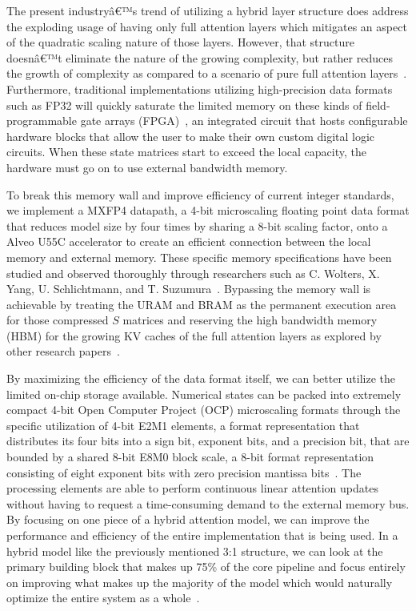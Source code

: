 ﻿\documentclass[conference]{IEEEtran}
\begin{document}
The present industryâ€™s trend of utilizing a hybrid layer structure does address the exploding usage of having only full attention layers which mitigates an aspect of the quadratic scaling nature of those layers. However, that structure doesnâ€™t eliminate the nature of the growing complexity, but rather reduces the growth of complexity as compared to a scenario of pure full attention layers~\cite{b9}. Furthermore, traditional implementations utilizing high-precision data formats such as FP32 will quickly saturate the limited memory on these kinds of field-programmable gate arrays (FPGA)~\cite{b10}, an integrated circuit that hosts configurable hardware blocks that allow the user to make their own custom digital logic circuits. When these state matrices start to exceed the local capacity, the hardware must go on to use external bandwidth memory.

To break this memory wall and improve efficiency of current integer standards, we implement a MXFP4 datapath, a 4-bit microscaling floating point data format that reduces model size by four times by sharing a 8-bit scaling factor, onto a Alveo U55C accelerator to create an efficient connection between the local memory and external memory. These specific memory specifications have been studied and observed thoroughly through researchers such as C. Wolters, X. Yang, U. Schlichtmann, and T. Suzumura~\cite{b5}. Bypassing the memory wall is achievable by treating the URAM and BRAM as the permanent execution area for those compressed $S$ matrices and reserving the high bandwidth memory (HBM) for the growing KV caches of the full attention layers as explored by other research papers~\cite{b10}.

By maximizing the efficiency of the data format itself, we can better utilize the limited on-chip storage available. Numerical states can be packed into extremely compact 4-bit Open Computer Project (OCP) microscaling formats through the specific utilization of 4-bit E2M1 elements, a format representation that distributes its four bits into a sign bit, exponent bits, and a precision bit, that are bounded by a shared 8-bit E8M0 block scale, a 8-bit format representation consisting of eight exponent bits with zero precision mantissa bits~\cite{b12}. The processing elements are able to perform continuous linear attention updates without having to request a time-consuming demand to the external memory bus. By focusing on one piece of a hybrid attention model, we can improve the performance and efficiency of the entire implementation that is being used. In a hybrid model like the previously mentioned 3:1 structure, we can look at the primary building block that makes up 75\% of the core pipeline and focus entirely on improving what makes up the majority of the model which would naturally optimize the entire system as a whole~\cite{b9}.
\end{document}
